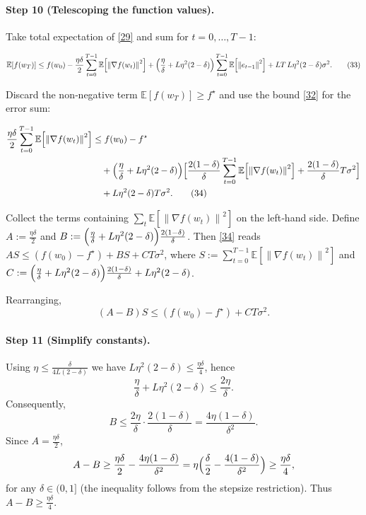 \documentclass{article}
\newcommand{\E}{\mathbb{E}}
\newcommand{\norm}[1]{\left\|#1\right\|}
\begin{document}
\paragraph{Step 10 (Telescoping the function values).}
Take total expectation of \eqref{29} and sum for $t=0,\dots ,T-1$:

\[
\E[f(w_{T})]\le f(w_{0})
-\frac{\eta\delta}{2}\sum_{t=0}^{T-1}\E\!\left[\norm{\nabla f(w_{t})}^{2}\right]
+ \Bigl(\frac{\eta}{\delta}+L\eta^{2}(2-\delta)\Bigr)\sum_{t=0}^{T-1}\E\!\left[\norm{e_{t-1}}^{2}\right]
+LT\,L\eta^{2}(2-\delta)\sigma^{2}. \tag{33}
\]

Discard the non‑negative term $\E[f(w_{T})]\ge f^{\star}$ and use the bound \eqref{32} for the error sum:

\[
\begin{aligned}
\frac{\eta\delta}{2}\sum_{t=0}^{T-1}\E\!\left[\norm{\nabla f(w_{t})}^{2}\right]
&\le f(w_{0})-f^{\star}\\
&\quad +\Bigl(\frac{\eta}{\delta}+L\eta^{2}(2-\delta)\Bigr)
\Bigl[\frac{2(1-\delta)}{\delta}\sum_{t=0}^{T-1}\E\!\left[\norm{\nabla f(w_{t})}^{2}\right]
+\frac{2(1-\delta)}{\delta}T\sigma^{2}\Bigr] \\
&\quad +L\eta^{2}(2-\delta)T\sigma^{2}. \tag{34}
\end{aligned}
\]

Collect the terms containing $\sum_{t}\E[\norm{\nabla f(w_{t})}^{2}]$ on the left‑hand side.
Define $A:=\frac{\eta\delta}{2}$ and 
$B:=\Bigl(\frac{\eta}{\delta}+L\eta^{2}(2-\delta)\Bigr)\frac{2(1-\delta)}{\delta}$.
Then \eqref{34} reads $A S \le (f(w_{0})-f^{\star}) + B S + C T\sigma^{2}$,
where $S:=\sum_{t=0}^{T-1}\E[\norm{\nabla f(w_{t})}^{2}]$ and
$C:=\Bigl(\frac{\eta}{\delta}+L\eta^{2}(2-\delta)\Bigr)\frac{2(1-\delta)}{\delta}+L\eta^{2}(2-\delta)$.

Rearranging,
\[
(A-B)S \le (f(w_{0})-f^{\star}) + C T\sigma^{2}. \tag{35}
\]

\paragraph{Step 11 (Simplify constants).}
Using $\eta\le\frac{\delta}{4L(2-\delta)}$ we have $L\eta^{2}(2-\delta)\le\frac{\eta\delta}{4}$, hence
\[
\frac{\eta}{\delta}+L\eta^{2}(2-\delta)\le\frac{2\eta}{\delta}. \tag{36}
\]
Consequently,
\[
B\le \frac{2\eta}{\delta}\cdot\frac{2(1-\delta)}{\delta}
= \frac{4\eta(1-\delta)}{\delta^{2}}. \tag{37}
\]
Since $A=\frac{\eta\delta}{2}$,
\[
A-B\ge \frac{\eta\delta}{2}-\frac{4\eta(1-\delta)}{\delta^{2}}
= \eta\Bigl(\frac{\delta}{2}-\frac{4(1-\delta)}{\delta^{2}}\Bigr) \ge \frac{\eta\delta}{4},
\]
for any $\delta\in(0,1]$ (the inequality follows from the stepsize restriction).  
Thus $A-B\ge \frac{\eta\delta}{4}$.
\end{document}
